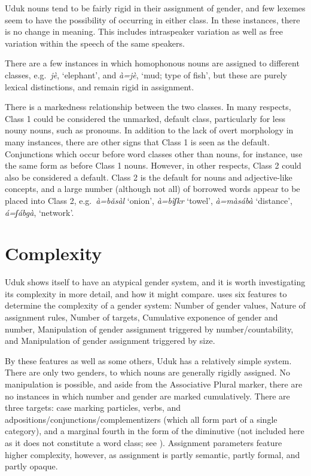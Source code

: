 \documentclass[output=collectionpaper,hidelinks]{langscibook}
\theoremstyle{remark}
\begin{document}
Uduk nouns tend to be fairly rigid in their assignment of gender, and few
lexemes seem to have the possibility of occurring in either class. In these
instances, there is no change in meaning. This includes intraspeaker variation
as well as free variation within the speech of the same speakers.

There are a few instances in which homophonous nouns are assigned to different
classes, e.g.\ \emph{jè}, `elephant', and \emph{à=jè}, `mud; type of fish',
but these are purely lexical distinctions, and remain rigid in assignment.

There is a markedness relationship between the two classes. In many respects,
Class 1 could be considered the unmarked, default class, particularly for less
nouny nouns, such as pronouns. In addition to the lack of overt morphology in
many instances, there are other signs that Class 1 is seen as the default.
Conjunctions which occur before word classes other than nouns, for instance, use
the same form as before Class 1 nouns.
However, in other respects, Class 2 could also be considered a default.  Class 2
is the default for nouns and adjective-like concepts, and a large number
(although not all) of borrowed words appear to be placed into Class 2, e.g.\
\emph{à=bǎsàl} `onion', \emph{à=bìʃk\iLowMid{}\hspace*{-0.6mm}r} `towel',
\emph{à=màsábà} `distance', \emph{á=ʃáb\aLowMid{}\hspace*{-.4mm}gà},
`network'.

\section{Complexity}
\label{sec:Complexity}

Uduk shows itself to have an atypical gender system, and it is worth
investigating its complexity in more detail, and how it might compare.
\citet[183]{DiGarbo2014} uses six features to determine the
complexity of a gender system: Number of gender values, Nature of assignment
rules, Number of targets, Cumulative exponence of gender and number,
Manipulation of gender assignment triggered by number/countability, and
Manipulation of gender assignment triggered by size.

By these features as well as some others, Uduk has a relatively
simple system. There are only two genders, to which nouns are generally rigidly
assigned. No manipulation is possible, and aside from the Associative Plural
marker, there are no instances in which number and gender are marked
cumulatively. There are three targets: case marking particles, verbs, and
adpositions\slash conjunctions\slash complementizers (which all form part of a single
category), and a marginal fourth in the form of the diminutive (not included
here as it does not constitute a word class; see ). Assignment parameters feature
higher complexity, however, as assignment is partly semantic, partly formal, and
partly opaque.
\end{document}
